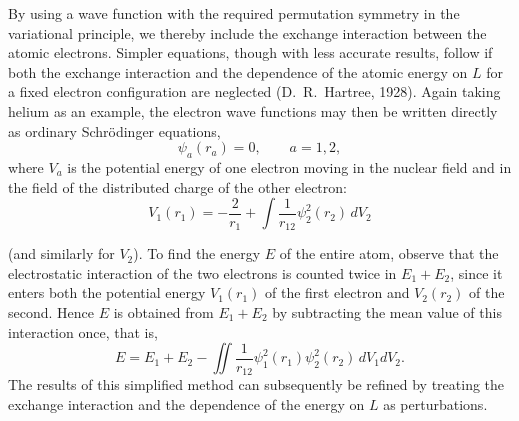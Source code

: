 By using a wave function with the required permutation symmetry in the variational principle, we thereby include the exchange interaction between the atomic electrons. Simpler equations, though with less accurate results, follow if both the exchange interaction and the dependence of the atomic energy on $L$ for a fixed electron configuration are neglected (D.~R.~Hartree, 1928). Again taking helium as an example, the electron wave functions may then be written directly as ordinary Schrödinger equations,
\begin{equation}
 [\tfrac12\Delta_a+E_a-V_a(r_a)]\psi_a(r_a)=0,\qquad a=1,2,
 \tag{69.7}
\end{equation}
where $V_a$ is the potential energy of one electron moving in the nuclear field and in the field of the distributed charge of the other electron:
\begin{equation}
 V_1(r_1)=-\frac2{r_1}+\int\frac1{r_{12}}\psi_2^2(r_2)\,dV_2
 \tag{69.8}
\end{equation}

(and similarly for $V_2$). To find the energy $E$ of the entire atom, observe that the electrostatic interaction of the two electrons is counted twice in $E_1+E_2$, since it enters both the potential energy $V_1(r_1)$ of the first electron and $V_2(r_2)$ of the second. Hence $E$ is obtained from $E_1+E_2$ by subtracting the mean value of this interaction once, that is,
\begin{equation}
 E=E_1+E_2-\iint\frac1{r_{12}}\psi_1^2(r_1)\psi_2^2(r_2)\,dV_1dV_2.
 \tag{69.9}
\end{equation}
The results of this simplified method can subsequently be refined by treating the exchange interaction and the dependence of the energy on $L$ as perturbations.




